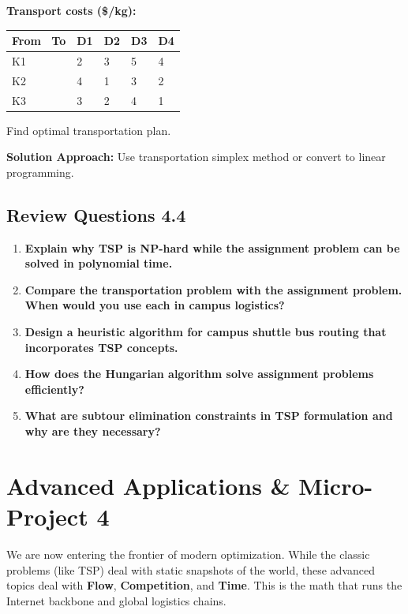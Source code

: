 \documentclass[
  letterpaper,
  DIV=11,
  numbers=noendperiod]{scrreprt}
\begin{document}
\textbf{Transport costs (\$/kg):}

\begin{longtable}[]{@{}lllll@{}}
\toprule\noalign{}
From ~To & D1 & D2 & D3 & D4 \\
\midrule\noalign{}
\endhead
\bottomrule\noalign{}
\endlastfoot
K1 & 2 & 3 & 5 & 4 \\
K2 & 4 & 1 & 3 & 2 \\
K3 & 3 & 2 & 4 & 1 \\
\end{longtable}

Find optimal transportation plan.

\textbf{Solution Approach:} Use transportation simplex method or convert
to linear programming.

\subsection{Review Questions 4.4}\label{review-questions-4.4}

\begin{enumerate}
\def\labelenumi{\arabic{enumi}.}
\item
  \textbf{Explain why TSP is NP-hard while the assignment problem can be
  solved in polynomial time.}
\item
  \textbf{Compare the transportation problem with the assignment
  problem. When would you use each in campus logistics?}
\item
  \textbf{Design a heuristic algorithm for campus shuttle bus routing
  that incorporates TSP concepts.}
\item
  \textbf{How does the Hungarian algorithm solve assignment problems
  efficiently?}
\item
  \textbf{What are subtour elimination constraints in TSP formulation
  and why are they necessary?}
\end{enumerate}

\section{Advanced Applications \& Micro-Project
4}\label{advanced-applications-micro-project-4}

We are now entering the frontier of modern optimization. While the
classic problems (like TSP) deal with static snapshots of the world,
these advanced topics deal with \textbf{Flow}, \textbf{Competition}, and
\textbf{Time}. This is the math that runs the Internet backbone and
global logistics chains.
\end{document}
